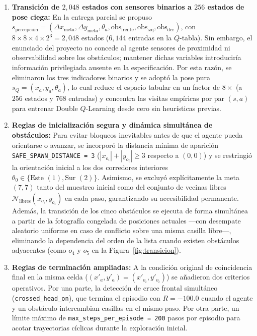 \documentclass[11pt,a4paper]{article}
\begin{document}
\begin{enumerate}[leftmargin=1.2cm]
    \item \textbf{Transición de \(2{,}048\) estados con sensores binarios a \(256\) estados de pose ciega:}
    En la entrega parcial se propuso \(s_{\text{percepción}} = (\Delta x_{\text{meta}}, \Delta y_{\text{meta}}, \theta_a, \text{obs}_{\text{frente}}, \text{obs}_{\text{izq}}, \text{obs}_{\text{der}})\), con \(8 \times 8 \times 4 \times 2^3 = 2{,}048\) estados (\(6{,}144\) entradas en la \(Q\)-tabla). Sin embargo, el enunciado del proyecto no concede al agente sensores de proximidad ni observabilidad sobre los obstáculos; mantener dichas variables introduciría información privilegiada ausente en la especificación. Por esta razón, se eliminaron los tres indicadores binarios y se adoptó la pose pura \(s_Q = (x_a, y_a, \theta_a)\), lo cual reduce el espacio tabular en un factor de \(8\times\) (a \(256\) estados y \(768\) entradas) y concentra las visitas empíricas por par \((s, a)\) para entrenar Double \(Q\)-Learning desde cero sin heurísticas previas.

    \item \textbf{Reglas de inicialización segura y dinámica simultánea de obstáculos:}
    Para evitar bloqueos inevitables antes de que el agente pueda orientarse o avanzar, se incorporó la distancia mínima de aparición \texttt{SAFE\_SPAWN\_DISTANCE = 3} (\(|x_{o_i}| + |y_{o_i}| \ge 3\) respecto a \((0,0)\)) y se restringió la orientación inicial a los dos corredores interiores \(\theta_0 \in \{\text{Este } (1), \text{Sur } (2)\}\). Asimismo, se excluyó explícitamente la meta \((7,7)\) tanto del muestreo inicial como del conjunto de vecinas libres \(\mathcal{N}_{\text{libres}}(x_{o_i}, y_{o_i})\) en cada paso, garantizando su accesibilidad permanente. Además, la transición de los cinco obstáculos se ejecuta de forma simultánea a partir de la fotografía congelada de posiciones actuales —con desempate aleatorio uniforme en caso de conflicto sobre una misma casilla libre—, eliminando la dependencia del orden de la lista cuando existen obstáculos adyacentes (como \(o_4\) y \(o_5\) en la Figura~\ref{fig:transicion}).

    \item \textbf{Reglas de terminación ampliadas:}
    A la condición original de coincidencia final en la misma celda (\((x'_a, y'_a) = (x'_{o_i}, y'_{o_i})\)) se añadieron dos criterios operativos. Por una parte, la detección de cruce frontal simultáneo (\texttt{crossed\_head\_on}), que termina el episodio con \(R = -100.0\) cuando el agente y un obstáculo intercambian casillas en el mismo paso. Por otra parte, un límite máximo de \texttt{max\_steps\_per\_episode = 200} pasos por episodio para acotar trayectorias cíclicas durante la exploración inicial.
\end{enumerate}
\end{document}
